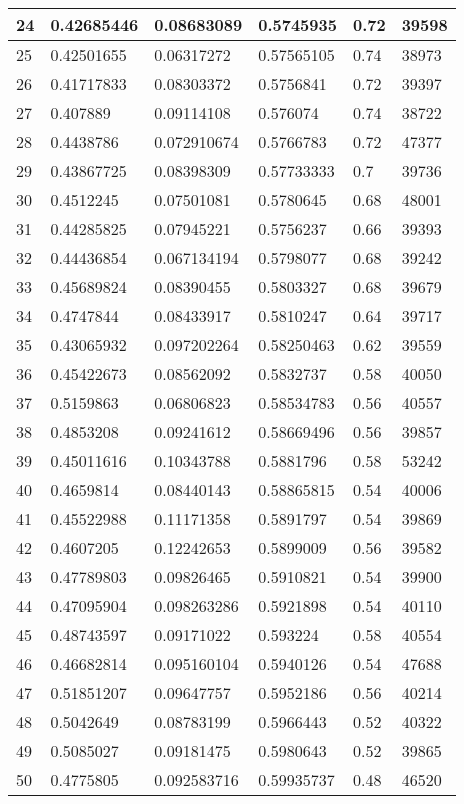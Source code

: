 \begin{longtable}{|l|l|l|l|l|l|}
24 & 0.42685446 & 0.08683089 & 0.5745935 & 0.72 & 39598 \\ \hline 
25 & 0.42501655 & 0.06317272 & 0.57565105 & 0.74 & 38973 \\ \hline 
26 & 0.41717833 & 0.08303372 & 0.5756841 & 0.72 & 39397 \\ \hline 
27 & 0.407889 & 0.09114108 & 0.576074 & 0.74 & 38722 \\ \hline 
28 & 0.4438786 & 0.072910674 & 0.5766783 & 0.72 & 47377 \\ \hline 
29 & 0.43867725 & 0.08398309 & 0.57733333 & 0.7 & 39736 \\ \hline 
30 & 0.4512245 & 0.07501081 & 0.5780645 & 0.68 & 48001 \\ \hline 
31 & 0.44285825 & 0.07945221 & 0.5756237 & 0.66 & 39393 \\ \hline 
32 & 0.44436854 & 0.067134194 & 0.5798077 & 0.68 & 39242 \\ \hline 
33 & 0.45689824 & 0.08390455 & 0.5803327 & 0.68 & 39679 \\ \hline 
34 & 0.4747844 & 0.08433917 & 0.5810247 & 0.64 & 39717 \\ \hline 
35 & 0.43065932 & 0.097202264 & 0.58250463 & 0.62 & 39559 \\ \hline 
36 & 0.45422673 & 0.08562092 & 0.5832737 & 0.58 & 40050 \\ \hline 
37 & 0.5159863 & 0.06806823 & 0.58534783 & 0.56 & 40557 \\ \hline 
38 & 0.4853208 & 0.09241612 & 0.58669496 & 0.56 & 39857 \\ \hline 
39 & 0.45011616 & 0.10343788 & 0.5881796 & 0.58 & 53242 \\ \hline 
40 & 0.4659814 & 0.08440143 & 0.58865815 & 0.54 & 40006 \\ \hline 
41 & 0.45522988 & 0.11171358 & 0.5891797 & 0.54 & 39869 \\ \hline 
42 & 0.4607205 & 0.12242653 & 0.5899009 & 0.56 & 39582 \\ \hline 
43 & 0.47789803 & 0.09826465 & 0.5910821 & 0.54 & 39900 \\ \hline 
44 & 0.47095904 & 0.098263286 & 0.5921898 & 0.54 & 40110 \\ \hline 
45 & 0.48743597 & 0.09171022 & 0.593224 & 0.58 & 40554 \\ \hline 
46 & 0.46682814 & 0.095160104 & 0.5940126 & 0.54 & 47688 \\ \hline 
47 & 0.51851207 & 0.09647757 & 0.5952186 & 0.56 & 40214 \\ \hline 
48 & 0.5042649 & 0.08783199 & 0.5966443 & 0.52 & 40322 \\ \hline 
49 & 0.5085027 & 0.09181475 & 0.5980643 & 0.52 & 39865 \\ \hline 
50 & 0.4775805 & 0.092583716 & 0.59935737 & 0.48 & 46520 \\ \hline 
\end{longtable}